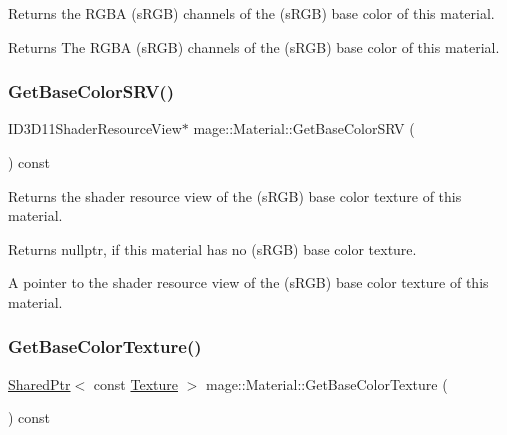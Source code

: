 Returns the R\+G\+BA (s\+R\+GB) channels of the (s\+R\+GB) base color of this material.

\begin{DoxyReturn}{Returns}
The R\+G\+BA (s\+R\+GB) channels of the (s\+R\+GB) base color of this material. 
\end{DoxyReturn}
\hypertarget{structmage_1_1_material_aef6ae5f87347d9e4bf798079aa906dd3}{}\label{structmage_1_1_material_aef6ae5f87347d9e4bf798079aa906dd3} 
\subsubsection{\texorpdfstring{Get\+Base\+Color\+S\+R\+V()}{GetBaseColorSRV()}}
{\footnotesize\ttfamily I\+D3\+D11\+Shader\+Resource\+View$\ast$ mage\+::\+Material\+::\+Get\+Base\+Color\+S\+RV (\begin{DoxyParamCaption}{ }\end{DoxyParamCaption}) const\hspace{0.3cm}{\ttfamily [noexcept]}}

Returns the shader resource view of the (s\+R\+GB) base color texture of this material.

\begin{DoxyReturn}{Returns}
{\ttfamily nullptr}, if this material has no (s\+R\+GB) base color texture. 

A pointer to the shader resource view of the (s\+R\+GB) base color texture of this material. 
\end{DoxyReturn}
\hypertarget{structmage_1_1_material_a76b84c808a281589d60ebbe2e2932c01}{}\label{structmage_1_1_material_a76b84c808a281589d60ebbe2e2932c01} 
\subsubsection{\texorpdfstring{Get\+Base\+Color\+Texture()}{GetBaseColorTexture()}}
{\footnotesize\ttfamily \hyperlink{namespacemage_a1e01ae66713838a7a67d30e44c67703e}{Shared\+Ptr}$<$ const \hyperlink{classmage_1_1_texture}{Texture} $>$ mage\+::\+Material\+::\+Get\+Base\+Color\+Texture (\begin{DoxyParamCaption}{ }\end{DoxyParamCaption}) const\hspace{0.3cm}{\ttfamily [noexcept]}}

